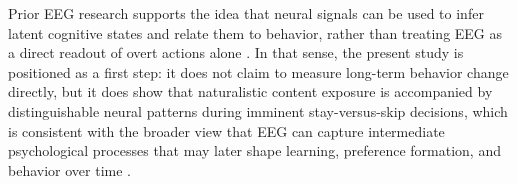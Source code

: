 Prior EEG research supports the idea that neural signals can be used to infer latent cognitive states and relate them to behavior, rather than treating EEG as a direct readout of overt actions alone \cite{bridwell_moving_2018, vo_deep_2024}. In that sense, the present study is positioned as a first step: it does not claim to measure long-term behavior change directly, but it does show that naturalistic content exposure is accompanied by distinguishable neural patterns during imminent stay-versus-skip decisions, which is consistent with the broader view that EEG can capture intermediate psychological processes that may later shape learning, preference formation, and behavior over time \cite{bridwell_moving_2018, vo_deep_2024}.

